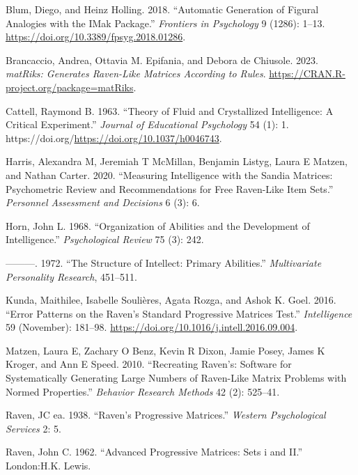 \documentclass[
]{article}
\newlength{\cslhangindent}
\newenvironment{CSLReferences}[2] %
 {\begin{list}{}{%
  \setlength{\itemindent}{0pt}
  \setlength{\leftmargin}{0pt}
  \setlength{\parsep}{0pt}
  \ifodd #1
   \setlength{\leftmargin}{\cslhangindent}
   \setlength{\itemindent}{-1\cslhangindent}
  \fi
  \setlength{\itemsep}{#2\baselineskip}}}
 {\end{list}}
\begin{document}
\label{refs}
\begin{CSLReferences}{1}{0}
Blum, Diego, and Heinz Holling. 2018. {``Automatic Generation of Figural
Analogies with the IMak Package.''} \emph{Frontiers in Psychology} 9
(1286): 1--13. \url{https://doi.org/10.3389/fpsyg.2018.01286}.

Brancaccio, Andrea, Ottavia M. Epifania, and Debora de Chiusole. 2023.
\emph{matRiks: Generates Raven-Like Matrices According to Rules}.
\url{https://CRAN.R-project.org/package=matRiks}.

Cattell, Raymond B. 1963. {``Theory of Fluid and Crystallized
Intelligence: A Critical Experiment.''} \emph{Journal of Educational
Psychology} 54 (1): 1.
https://doi.org/\url{https://doi.org/10.1037/h0046743}.

Harris, Alexandra M, Jeremiah T McMillan, Benjamin Listyg, Laura E
Matzen, and Nathan Carter. 2020. {``Measuring Intelligence with the
Sandia Matrices: Psychometric Review and Recommendations for Free
Raven-Like Item Sets.''} \emph{Personnel Assessment and Decisions} 6
(3): 6.

Horn, John L. 1968. {``Organization of Abilities and the Development of
Intelligence.''} \emph{Psychological Review} 75 (3): 242.

---------. 1972. {``The Structure of Intellect: Primary Abilities.''}
\emph{Multivariate Personality Research}, 451--511.

Kunda, Maithilee, Isabelle Soulières, Agata Rozga, and Ashok K. Goel.
2016. {``Error Patterns on the {Raven}'s {Standard} {Progressive}
{Matrices} {Test}.''} \emph{Intelligence} 59 (November): 181--98.
\url{https://doi.org/10.1016/j.intell.2016.09.004}.

Matzen, Laura E, Zachary O Benz, Kevin R Dixon, Jamie Posey, James K
Kroger, and Ann E Speed. 2010. {``Recreating Raven's: Software for
Systematically Generating Large Numbers of Raven-Like Matrix Problems
with Normed Properties.''} \emph{Behavior Research Methods} 42 (2):
525--41.

Raven, JC ea. 1938. {``Raven's Progressive Matrices.''} \emph{Western
Psychological Services} 2: 5.

Raven, John C. 1962. {``Advanced Progressive Matrices: Sets i and II.''}
London:H.K. Lewis.


\end{CSLReferences}
\end{document}
